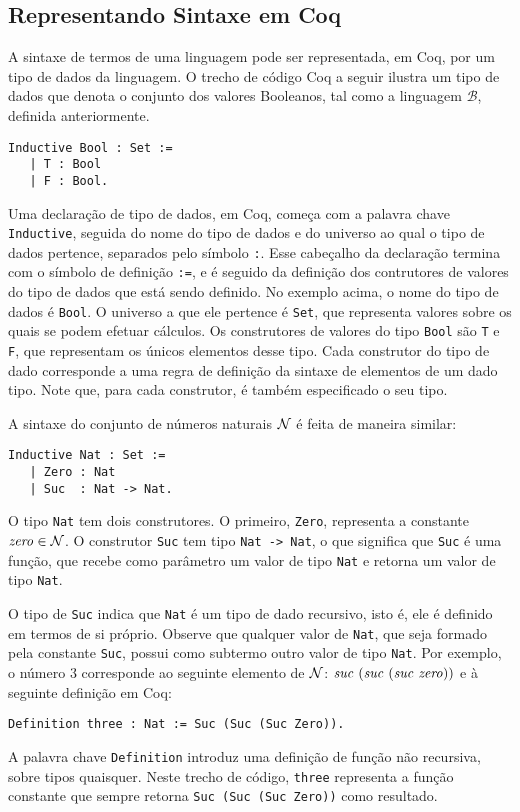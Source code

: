 \subsection{Representando Sintaxe em Coq}

A sintaxe de termos de uma linguagem pode ser representada, em Coq, por um tipo de dados da linguagem. O trecho de c\'odigo Coq a seguir ilustra um tipo de dados que denota o conjunto dos valores Booleanos, tal como a linguagem $\mathcal{B}$, definida anteriormente.

\begin{lstlisting}
Inductive Bool : Set :=
   | T : Bool
   | F : Bool.
\end{lstlisting}

Uma declaração de tipo de dados, em Coq, começa com a palavra chave \texttt{Inductive}, seguida do nome do tipo de dados e do universo ao qual o tipo de dados pertence, separados pelo símbolo \texttt{:}. Esse cabeçalho da declaração termina com o símbolo de definição \texttt{:=}, e é seguido da definição dos contrutores de valores do tipo de dados que está sendo definido. No exemplo acima, o nome do tipo de dados é \texttt{Bool}. O universo a que ele pertence é \texttt{Set}, que representa valores sobre os quais se podem efetuar c\'alculos. Os construtores de valores do tipo \texttt{Bool} são \texttt{T} e \texttt{F}, que representam os únicos elementos desse tipo. Cada construtor do tipo de dado corresponde a uma regra de definição da sintaxe de elementos de um dado tipo. Note que, para cada construtor, é também especificado o seu tipo.

A sintaxe do conjunto de n\'umeros naturais $\mathcal{N}$ \'e feita de maneira similar:
\begin{lstlisting}
Inductive Nat : Set :=
   | Zero : Nat
   | Suc  : Nat -> Nat.
\end{lstlisting}
O tipo \texttt{Nat} tem dois construtores. O primeiro, \texttt{Zero}, representa a constante $\textit{zero\/}\in \mathcal{N}$. O construtor \texttt{Suc} tem tipo \texttt{Nat -> Nat}, o que significa que  \texttt{Suc} é uma função, que recebe como par\^ametro um valor de tipo \texttt{Nat} e retorna um valor de tipo \texttt{Nat}. 

O tipo de \texttt{Suc} indica que \texttt{Nat} \'e um tipo de dado recursivo, isto \'e, ele \'e definido em termos de si pr\'oprio. Observe que qualquer valor de \texttt{Nat}, que seja formado pela constante \texttt{Suc}, possui como subtermo outro valor de tipo \texttt{Nat}. Por exemplo, o n\'umero $3$ corresponde ao seguinte elemento de $\mathcal{N}$: $\textit{suc\/}\,\,(\textit{suc\/}\,\,(\textit{suc\/}\,\,\textit{zero\/}))$ e à seguinte defini\c{c}\~ao em Coq:
\begin{lstlisting}
Definition three : Nat := Suc (Suc (Suc Zero)).
\end{lstlisting}
A palavra chave \texttt{Definition} introduz uma defini\c{c}\~ao de função n\~ao recursiva, sobre tipos quaisquer. Neste trecho de c\'odigo, \texttt{three} representa a fun\c{c}\~ao constante que sempre retorna \texttt{Suc (Suc (Suc Zero))} como resultado.

